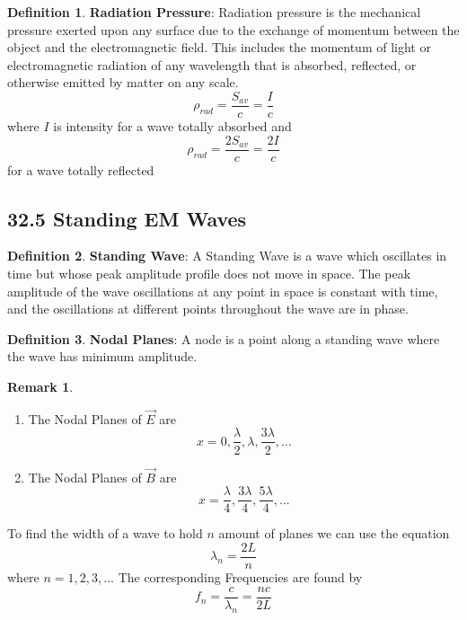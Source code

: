 \documentclass[12pt]{amsart}
\theoremstyle{definition}
\newtheorem{definition}{Definition} %
\newtheorem*{remark}{Remark}        %
\numberwithin{equation}{theorem}    %
\begin{document}
\begin{definition}
    \textbf{Radiation Pressure}:
    Radiation pressure is the mechanical pressure exerted upon any surface due to the exchange of momentum between the object and the electromagnetic field. This includes the momentum of light or electromagnetic radiation of any wavelength that is absorbed, reflected, or otherwise emitted by matter on any scale. 
    $$\rho_{rad} = \frac{S_{av}}{c} = \frac{I}{c}$$ where $I$ is intensity for a wave totally absorbed and $$\rho_{rad} = \frac{2S_{av}}{c} = \frac{2I}{c}$$ for a wave totally reflected
\end{definition}

\subsection*{32.5 Standing EM Waves}

\begin{definition}
    \textbf{Standing Wave}:
    A Standing Wave is a wave which oscillates in time but whose peak amplitude profile does not move in space. The peak amplitude of the wave oscillations at any point in space is constant with time, and the oscillations at different points throughout the wave are in phase.
\end{definition}

\begin{definition}
    \textbf{Nodal Planes}:
    A node is a point along a standing wave where the wave has minimum amplitude.
    \begin{remark}
        \begin{enumerate}
            \item The Nodal Planes of $\vec{E}$ are $$x = 0, \frac{\lambda}{2}, \lambda, 
            \frac{3\lambda}{2},...$$
            \item The Nodal Planes of $\vec{B}$ are $$x = \frac{\lambda}{4}, \frac{3\lambda}{4},
            \frac{5\lambda}{4},...$$
        \end{enumerate}
        To find the width of a wave to hold $n$ amount of planes we can use the equation
        $$\lambda_n = \frac{2L}{n}$$ where $n = 1,2,3,...$
       The corresponding Frequencies are found by $$f_n = \frac{c}{\lambda_n} = \frac{nc}{2L}$$
    \end{remark}
\end{definition}
\end{document}
